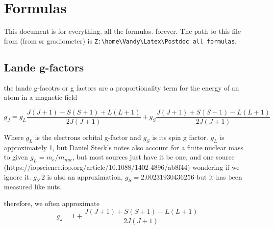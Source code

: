 \documentclass[../../main.tex]{subfiles} %
\begin{document}
\chapter{Formulas}
This document is for everything. all the formulas. forever. The path to this file from (from sr gradiometer) is \verb|Z:\home\Vandy\Latex\Postdoc all formulas|. 

\section{Lande g-factors}
the lande g-facotrs or g factors are a proportionality term for the energy of an atom in a magnetic field

$$ g_J=g_L\frac{J(J+1)-S(S+1)+L(L+1)}{2J(J+1)}+g_S\frac{J(J+1)+S(S+1)-L(L+1)}{2J(J+1)}$$

Where $g_L$ is the electrons orbital g-factor and $g_S$ is its spin g factor. $g_L$ is approximately 1, but Daniel Steck's notes also account for a finite nuclear mass to given $g_L=m_e/m_{nuc}$, but most sources just have it be one, and one source (https://iopscience.iop.org/article/10.1088/1402-4896/ab8f44) wondering if we ignore it. $g_S~2$ is also an approximation, $g_S=2.00231930436256$ but it has been measured like nuts. 

therefore, we often approximate $$g_J=1+\frac{J(J+1)+S(S+1)-L(L+1)}{2J(J+1)}$$
\end{document}
